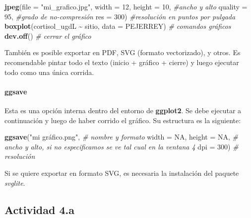 \documentclass[
]{article}
\newenvironment{Shaded}{\begin{snugshade}}{\end{snugshade}}
\newcommand{\AttributeTok}[1]{\textcolor[rgb]{0.13,0.29,0.53}{#1}}
\newcommand{\CommentTok}[1]{\textcolor[rgb]{0.56,0.35,0.01}{\textit{#1}}}
\newcommand{\ConstantTok}[1]{\textcolor[rgb]{0.56,0.35,0.01}{#1}}
\newcommand{\DecValTok}[1]{\textcolor[rgb]{0.00,0.00,0.81}{#1}}
\newcommand{\FunctionTok}[1]{\textcolor[rgb]{0.13,0.29,0.53}{\textbf{#1}}}
\newcommand{\NormalTok}[1]{#1}
\newcommand{\SpecialCharTok}[1]{\textcolor[rgb]{0.81,0.36,0.00}{\textbf{#1}}}
\newcommand{\StringTok}[1]{\textcolor[rgb]{0.31,0.60,0.02}{#1}}
\begin{document}
\begin{Shaded}
\begin{Highlighting}[]
\FunctionTok{jpeg}\NormalTok{(}\AttributeTok{file =} \StringTok{"mi\_grafico.jpg"}\NormalTok{,}
      \AttributeTok{width =} \DecValTok{12}\NormalTok{, }\AttributeTok{height =} \DecValTok{10}\NormalTok{, }\CommentTok{\#ancho y alto}
     \AttributeTok{quality =} \DecValTok{95}\NormalTok{, }\CommentTok{\#grado de no{-}compresión}
     \AttributeTok{res =} \DecValTok{300}\NormalTok{) }\CommentTok{\#resolución en puntos por pulgada}
\FunctionTok{boxplot}\NormalTok{(cortisol\_ugdL }\SpecialCharTok{\textasciitilde{}}\NormalTok{ sitio,}
        \AttributeTok{data =}\NormalTok{ PEJERREY) }\CommentTok{\# comandos gráficos}
\FunctionTok{dev.off}\NormalTok{() }\CommentTok{\# cerrar el gráfico}
\end{Highlighting}
\end{Shaded}

También es posible exportar en PDF, SVG (formato vectorizado), y otros.
Es recomendable pintar todo el texto (inicio + gráfico + cierre) y luego
ejecutar todo como una única corrida.

\paragraph{ggsave}\label{ggsave}

Esta es una opción interna dentro del entorno de \textbf{ggplot2}. Se
debe ejecutar a continuación y luego de haber corrido el gráfico. Su
estructura es la siguiente:

\begin{Shaded}
\begin{Highlighting}[]
\FunctionTok{ggsave}\NormalTok{(}\StringTok{"mi gráfico.png"}\NormalTok{, }\CommentTok{\# nombre y formato}
       \AttributeTok{width =} \ConstantTok{NA}\NormalTok{, }\AttributeTok{height =} \ConstantTok{NA}\NormalTok{, }\CommentTok{\# ancho y alto, si no especificamos se ve tal cual en la ventana 4}
       \AttributeTok{dpi =} \DecValTok{300}\NormalTok{) }\CommentTok{\# resolución}
\end{Highlighting}
\end{Shaded}

Si se quiere exportar en formato SVG, es necesaria la instalación del
paquete \emph{svglite}.

\subsection{Actividad 4.a}\label{actividad-4.a}
\end{document}
